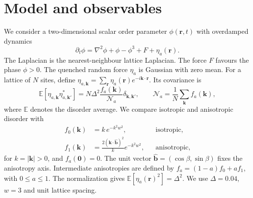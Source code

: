 \section{Model and observables}
\label{sec:model}

We consider a two-dimensional scalar order parameter $\phi(\boldsymbol r,t)$ with
overdamped dynamics
\begin{equation}
 \partial_t\phi=\nabla^2\phi+\phi-\phi^3+F+\eta_a(\boldsymbol r).
 \label{eq:model}
\end{equation}
The Laplacian is the nearest-neighbour lattice Laplacian.
The force $F$ favours the phase $\phi>0$.
The quenched random force $\eta_a$ is Gaussian with zero mean.
For a lattice of $N$ sites, define
$\eta_{a,\boldsymbol k}=\sum_{\boldsymbol r}
\eta_a(\boldsymbol r)e^{-i\boldsymbol k\cdot\boldsymbol r}$.
Its covariance is
\begin{equation}
 \mathbb E[\eta_{a,\boldsymbol k}\eta_{a,\boldsymbol k'}^*]
 =N\Delta^2\frac{f_a(\boldsymbol k)}{\mathcal N_a}
 \delta_{\boldsymbol k,\boldsymbol k'},
 \qquad
 \mathcal N_a=\frac{1}{N}\sum_{\boldsymbol k}f_a(\boldsymbol k),
 \label{eq:noise-covariance}
\end{equation}
where $\mathbb E$ denotes the disorder average. We compare isotropic
and anisotropic disorder with
\begin{align}
 f_0(\boldsymbol k)&=k\,e^{-k^2w^2},
 & &\text{isotropic},\nonumber\\
 f_1(\boldsymbol k)&=
 \frac{2(\boldsymbol k\cdot\hat{\boldsymbol b})^2}{k}
 e^{-k^2w^2},
 & &\text{anisotropic},
 \label{eq:two-disorders}
\end{align}
for $k=|\boldsymbol k|>0$, and $f_a(\boldsymbol 0)=0$.
The unit vector $\hat{\boldsymbol b}=(\cos\beta,\sin\beta)$ fixes the
anisotropy axis. Intermediate anisotropies are defined by
$f_a=(1-a)f_0+af_1$, with $0\leq a\leq1$.
The normalization gives $\mathbb E[\eta_a(\boldsymbol r)^2]=\Delta^2$.
We use $\Delta=0.04$, $w=3$ and unit lattice spacing.

